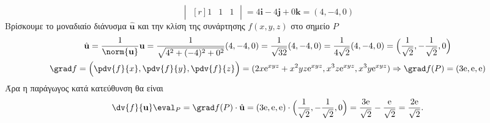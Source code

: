 \documentclass[a4paper,table]{report}
\begin{document}
\begin{solution}
\[\begin{vmatrix*}[r]
      1 & 1 & 1
    \end{vmatrix*} = 
    4 \mathbf{i} -4 \mathbf{j} + 0 \mathbf{k} = (4,-4,0)
  \] 
  Βρίσκουμε το μοναδιαίο διάνυσμα $ \hat{\mathbf{u}} $ και την κλίση της συνάρτησης 
  $ f(x,y,z) $ στο σημείο $P$
  \begin{gather*}
    \hat{\mathbf{u}} = \frac{1}{\norm{\mathbf{u}}} \mathbf{u} =
    \frac{1}{\sqrt{4^{2}+(-4)^{2}+0^{2}}} (4,-4,0) = \frac{1}{\sqrt{32}} (4,-4,0) =
  \frac{1}{4 \sqrt{2}} (4,-4,0) = \Bigl(\frac{1}{\sqrt{2}} , - \frac{1}{\sqrt{2}},0\Bigr)
  \\
  \grad f = \Bigl(\pdv{f}{x} , \pdv{f}{y} , \pdv{f}{z}\Bigr) = 
  (2x \mathrm{e}^{xyz} + x^{2}yz \mathrm{e}^{xyz}, x^{3}z \mathrm{e}^{xyz}, x^{3}y 
  \mathrm{e}^{xyz}) \Rightarrow \grad f (P) = (3 \mathrm{e}, \mathrm{e}, \mathrm{e}) 
   \end{gather*} 
   Άρα η παράγωγος κατά κατεύθυνση θα είναι
   \[
     \dv{f}{\mathbf{u}}\eval_{P} = \grad f(P) \cdot \hat{\mathbf{u}} = (3 \mathrm{e},
   \mathrm{e}, \mathrm{e}) \cdot \Bigl(\frac{1}{\sqrt{2}} , - \frac{1}{\sqrt{2}} , 0\Bigr) = 
     \frac{3 \mathrm{e}}{\sqrt{2}} - \frac{\mathrm{e}}{\sqrt{2}} = \frac{2
     \mathrm{e}}{\sqrt{2}}.
    \] 
\end{solution}
\end{document}
